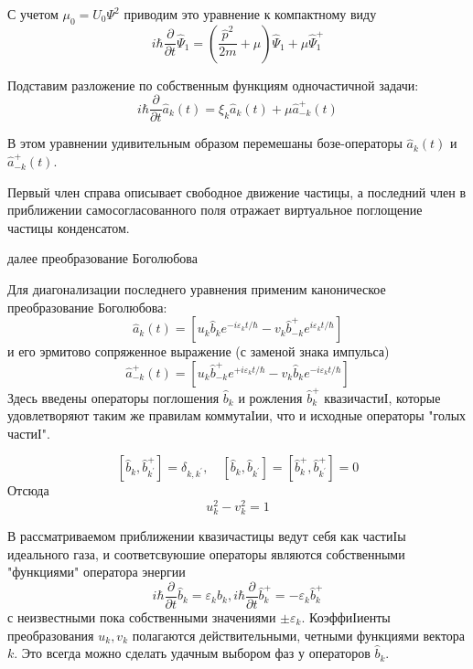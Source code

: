 \documentclass[a4paper,12pt]{article} %
\begin{document}
\begin{ttask}
С учетом $\mu_{0}=U_{0} \Psi^{2}$ приводим это уравнение к компактному виду
$$
i \hbar \frac{\partial}{\partial t} \hat{\Psi}_{1}
=
\left(\frac{\hat{p}^{2}}{2 m}+\mu\right) \hat{\Psi}_{1}+\mu \hat{\Psi}_{1}^{+}
$$

Подставим разложение по собственным функциям одночастичной задачи:
$$
i \hbar \frac{\partial}{\partial t} \hat{a}_{k}(t)=\xi_{k} \hat{a}_{k}(t)+\mu \hat{a}_{-k}^{+}(t)
$$


В этом уравнении удивительным образом перемешаны бозе-операторы $\hat{a}_{k}(t)$ и $\hat{a}_{-k}^{+}(t) .$ 

Первый член справа описывает свободное движение частицы, 
а последний член в приближении самосогласованного поля 
отражает виртуальное поглощение частицы конденсатом.





далее преобразование Боголюбова



Для диагонализации последнего уравнения  применим каноническое преобразование Боголюбова:
$$
\hat{a}_{k}(t)=\left[u_{k} \hat{b}_{k} e^{-i \varepsilon_{k} t / \hbar}-v_{k} \hat{b}_{-k}^{+} e^{i \varepsilon_{k} t / \hbar}\right]
$$
и его эрмитово сопряженное выражение (с заменой знака импульса)
$$
\hat{a}_{-k}^{+}(t)=\left[u_{k} \hat{b}_{-k}^{+} e^{+i \varepsilon_{k} t / \hbar}-v_{k} \hat{b}_{k} e^{-i \varepsilon_{k} t / \hbar}\right]
$$
Здесь введены операторы поглошения $\hat{b}_{k}$ и рожления $\hat{b}_{k}^{+}$ квазичастиІ, которые удовлетворяют таким же правилам коммутаІии, что и исходные операторы "голых частиІ".



$$
\left[\hat{b}_{k}, \hat{b}_{k^{\prime}}^{+}\right]=\delta_{k, k^{\prime}}, \quad\left[\hat{b}_{k}, \hat{b}_{k^{\prime}}\right]=\left[\hat{b}_{k}^{+}, \hat{b}_{k^{\prime}}^{+}\right]=0
$$
Отсюда
$$
u_{k}^{2}-v_{k}^{2}=1
$$



В рассматриваемом приближении квазичастицы ведут себя как частиІы идеального газа, и соответсвуюшие операторы являются собственными "функциями" оператора энергии
$$
i \hbar \frac{\partial}{\partial t} \hat{b}_{k}=\varepsilon_{k} \hat{b}_{k}, i \hbar \frac{\partial}{\partial t} \hat{b}_{k}^{+}=-\varepsilon_{k} \hat{b}_{k}^{+}
$$
с неизвестными пока собственными значениями $\pm \varepsilon_{k} .$ КоэффиІиенты преобразования $u_{k}, v_{k}$ полагаются действительными, четными функциями вектора $k .$ Это всегда можно сделать удачным выбором фаз у операторов $\hat{b}_{k}$.




\end{ttask}
\end{document}
